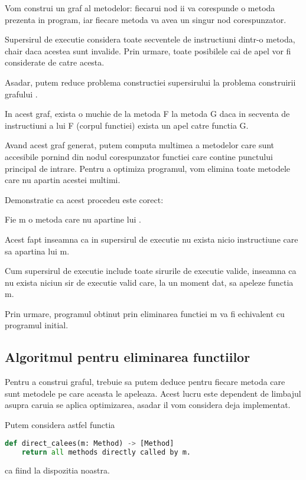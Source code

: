 Vom construi un graf  al metodelor: fiecarui nod ii va
corespunde o metoda prezenta in program, iar fiecare metoda va
avea un singur nod corespunzator.

Supersirul de executie considera toate secventele de instructiuni
dintr-o metoda, chair daca acestea sunt invalide.
Prin urmare, toate posibilele cai de apel vor fi considerate de
catre acesta.

Asadar, putem reduce problema constructiei supersirului la
problema construirii grafului .

In acest graf, exista o muchie de la metoda F la metoda
G daca in secventa de instructiuni a lui F (corpul functiei)
exista un apel catre functia G.

Avand acest graf generat, putem computa multimea  a metodelor
care sunt accesibile pornind din nodul corespunzator functiei care
contine punctului principal de intrare.
Pentru a optimiza programul, vom elimina toate metodele care nu
apartin acestei multimi.

Demonstratie ca acest procedeu este corect:
\begin{lemma}

	Fie m o metoda care nu apartine lui .

	Acest fapt inseamna ca in supersirul de executie nu exista nicio
	instructiune care sa apartina lui m.

	Cum supersirul de executie include toate sirurile de executie
	valide, inseamna ca nu exista niciun sir de executie valid care,
	la un moment dat, sa apeleze functia m.

	Prin urmare, programul obtinut prin eliminarea functiei m va fi
	echivalent cu programul initial.
\end{lemma}

\subsection{Algoritmul pentru eliminarea functiilor}

Pentru a construi graful, trebuie sa putem deduce pentru fiecare
metoda care sunt metodele pe care aceasta le apeleaza.
Acest lucru este dependent de limbajul asupra caruia se aplica
optimizarea, asadar il vom considera deja implementat.

Putem considera astfel functia
\begin{lstlisting}[language=Python]
def direct_calees(m: Method) -> [Method]
    return all methods directly called by m.
\end{lstlisting}
ca fiind la dispozitia noastra.

